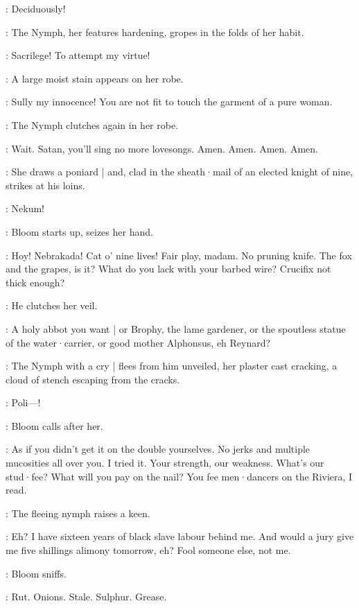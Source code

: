 \Yews:
Deciduously!

:
The Nymph,
her features hardening,
gropes in the folds of her habit.

\Nymph:
Sacrilege!
To attempt my virtue!

:
A large moist stain appears on her robe.

\Nymph:
Sully my innocence!
You are not fit to touch the garment of a pure woman.

:
The Nymph clutches again in her robe.

\Nymph:
Wait.
Satan,
you'll sing no more lovesongs.
Amen.
Amen.
Amen.
Amen.

:
She draws a poniard |
and,
clad in the sheath·mail of an elected knight of nine,
strikes at his loins.

\Nymph:
Nekum!

:
Bloom starts up,
seizes her hand.

\Bloom:
Hoy!
Nebrakada!
Cat o' nine lives!
Fair play,
madam.
No pruning knife.
The fox and the grapes,
is it?
What do you lack with your barbed wire?
Crucifix not thick enough?

:
He clutches her veil.

\Bloom:
A holy abbot you want |
or Brophy,
the lame gardener,
or the spoutless statue of the water·carrier,
or good mother Alphonsus,
eh Reynard?

:
The Nymph with a cry |
flees from him unveiled,
her plaster cast cracking,
a cloud of stench escaping from the cracks.

\Nymph:
Poli---!

:
Bloom calls after her.

\Bloom:
As if you didn't get it on the double yourselves.
No jerks and multiple mucosities all over you.
I tried it.
Your strength,
our weakness.
What's our stud·fee?
What will you pay on the nail?
You fee men·dancers on the Riviera,
I read.

:
The fleeing nymph raises a keen.

\Bloom:
Eh?
I have sixteen years of black slave labour behind me.
And would a jury give me five shillings alimony tomorrow,
eh?
Fool someone else,
not me.

:
Bloom sniffs.

\Bloom:
Rut.
Onions.
Stale.
Sulphur.
Grease.


